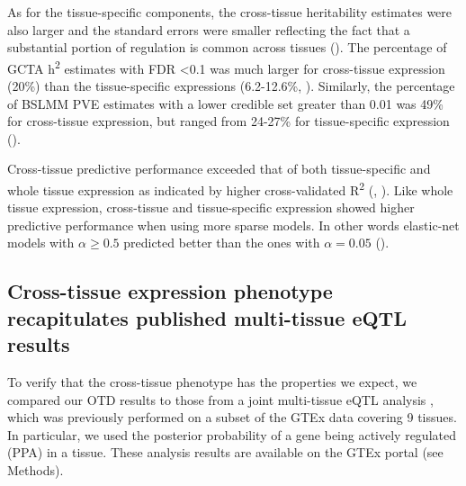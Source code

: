 \documentclass[10pt,letterpaper]{article}
\begin{document}
As for the tissue-specific components, 
the cross-tissue heritability estimates were also larger and the standard errors were smaller reflecting the fact that a substantial portion of regulation is common across tissues (). The percentage of GCTA h\textsuperscript{2} estimates with FDR \textless{0.1}  was much larger for cross-tissue expression (20\%) than the tissue-specific expressions (6.2-12.6\%, ). Similarly, the percentage of BSLMM PVE estimates with a lower credible set greater than 0.01 was 49\% for cross-tissue expression, but ranged from 24-27\% for tissue-specific expression ().

Cross-tissue predictive performance exceeded that of both tissue-specific and whole tissue expression as indicated by higher cross-validated R\textsuperscript{2} (, ). Like whole tissue expression, cross-tissue and tissue-specific expression showed higher predictive performance when using more sparse models. In other words elastic-net models with \(\alpha \geq 0.5\) predicted better than the ones with \(\alpha=0.05\) (). 



\subsection*{Cross-tissue expression phenotype recapitulates published multi-tissue eQTL results}

To verify that the cross-tissue phenotype has the properties we expect, we compared our OTD results to those from a joint multi-tissue eQTL analysis  \cite{Flutre_2013}, which was previously performed on a subset of the GTEx data \cite{Ardlie_2015} covering 9 tissues. In particular, we used the posterior probability of a gene being actively regulated (PPA) in a tissue. These analysis results are available on the GTEx portal (see Methods).
\end{document}
